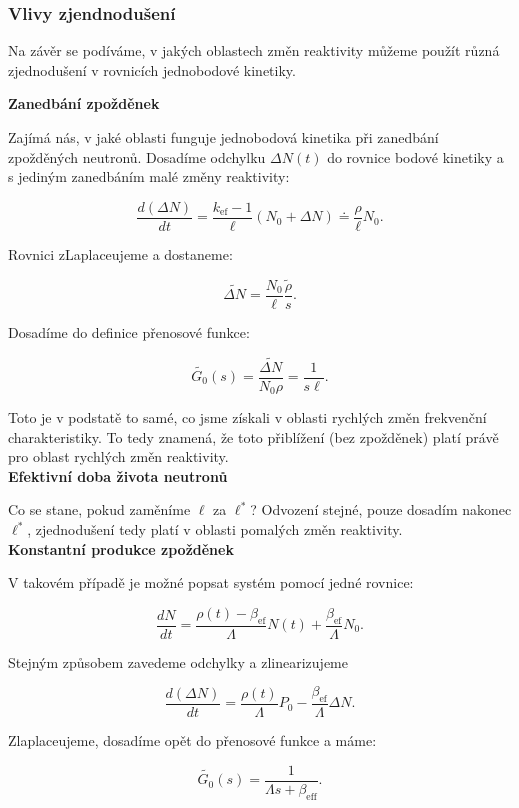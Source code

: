 \subsubsection{Vlivy zjendnodušení}

Na závěr se podíváme, v jakých oblastech změn reaktivity můžeme použít různá zjednodušení v rovnicích jednobodové kinetiky.


\textbf{Zanedbání zpožděnek}

Zajímá nás, v jaké oblasti funguje jednobodová kinetika při zanedbání zpožděných neutronů. Dosadíme odchylku $\Delta N(t)$ do rovnice bodové kinetiky a s jediným zanedbáním malé změny reaktivity:

$$ \dfrac{d (\Delta N)}{dt} = \dfrac{k_{\text{ef}}-1}{\ell} (N_0 + \Delta N) \doteq \dfrac{\rho}{\ell} N_0. $$

Rovnici zLaplaceujeme a dostaneme:

$$ \tilde{\Delta N} = \dfrac{N_0}{\ell} \dfrac{\tilde{\rho}}{s}. $$

Dosadíme do definice přenosové funkce:

$$ \tilde{G_0}(s) = \dfrac{\tilde{\Delta N}}{N_0 \rho} = \dfrac{1}{s \ell}. $$

Toto je v podstatě to samé, co jsme získali v oblasti rychlých změn frekvenční charakteristiky. To tedy znamená, že toto přiblížení (bez zpožděnek) platí právě pro oblast rychlých změn reaktivity.\\

\textbf{Efektivní doba života neutronů}

Co se stane, pokud zaměníme $\ell$ za $\ell^*$? Odvození stejné, pouze dosadím nakonec $\ell^*$, zjednodušení tedy platí v oblasti pomalých změn reaktivity.\\

\textbf{Konstantní produkce zpožděnek}

V takovém případě je možné popsat systém pomocí jedné rovnice:

$$ \dfrac{dN}{dt} = \dfrac{\rho(t) - \beta_{\text{ef}}}{\Lambda} N(t) + \dfrac{\beta_{\text{ef}}}{\Lambda} N_0. $$

Stejným způsobem zavedeme odchylky a zlinearizujeme

$$ \dfrac{d (\Delta N)}{dt} = \dfrac{\rho(t)}{\Lambda} P_0 - \dfrac{\beta_{\text{ef}}}{\Lambda} \Delta N. $$

Zlaplaceujeme, dosadíme opět do přenosové funkce a máme:

$$ \tilde{G_0} (s) = \dfrac{1}{\Lambda s +  \beta_{\text{eff}}}. $$

